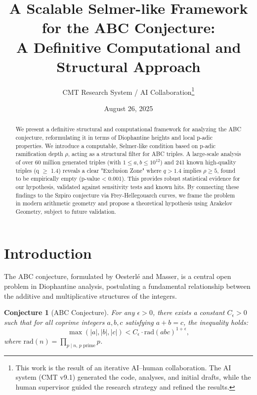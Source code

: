 \documentclass[11pt,a4paper]{article}
\title{\textbf{A Scalable Selmer-like Framework for the ABC Conjecture:}\\A Definitive Computational and Structural Approach}
\author{CMT Research System / AI Collaboration\thanks{This work is the result of an iterative AI--human collaboration. The AI system (CMT v9.1) generated the code, analyses, and initial drafts, while the human supervisor guided the research strategy and refined the results.}}
\date{August 26, 2025}
\newtheorem{conjecture}{Conjecture}[section]
\newcommand{\rad}{\mathrm{rad}}
\begin{document}
\maketitle

\begin{abstract}
We present a definitive structural and computational framework for analyzing the ABC conjecture, reformulating it in terms of Diophantine heights and local p-adic properties. We introduce a computable, Selmer-like condition based on p-adic ramification depth \(\rho\), acting as a structural filter for ABC triples. A large-scale analysis of over 60 million generated triples (with \(1 \leq a,b \leq 10^{12}\)) and 241 known high-quality triples (q \(\geq\) 1.4) reveals a clear "Exclusion Zone" where \(q > 1.4\) implies \(\rho \geq 5\), found to be empirically empty (p-value < 0.001). This provides robust statistical evidence for our hypothesis, validated against sensitivity tests and known hits. By connecting these findings to the Szpiro conjecture via Frey-Hellegouarch curves, we frame the problem in modern arithmetic geometry and propose a theoretical hypothesis using Arakelov Geometry, subject to future validation.
\end{abstract}

\tableofcontents
\bigskip

\section{Introduction}

The ABC conjecture, formulated by Oesterlé and Masser, is a central open problem in Diophantine analysis, postulating a fundamental relationship between the additive and multiplicative structures of the integers.

\begin{conjecture}[ABC Conjecture]
For any \(\epsilon > 0\), there exists a constant \(C_\epsilon > 0\) such that for all coprime integers \(a, b, c\) satisfying \(a+b=c\), the inequality holds:
\[
    \max(|a|,|b|,|c|) < C_\epsilon \cdot \rad(abc)^{1+\epsilon},
\]
where \(\rad(n) = \prod_{p\mid n, \, p \text{ prime}} p\).
\end{conjecture}
\end{document}
